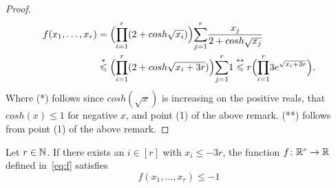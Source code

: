 \begin{proof} 
  \begin{equation*}
    \begin{align}
    f(x_1,\dots,x_r)&= \Bigl(\overunderset{r}{i=1}{\prod}(2+cosh\sqrt{x_i})\Bigr)\overunderset{r}{j=1}{\sum}\frac{x_j}{2+cosh \sqrt{x_j}}\\
    &\overset{*}{\leq} \Bigl(\overunderset{r}{i=1}{\prod}(2+cosh\sqrt{x_i +3r})\Bigr)\overunderset{r}{j=1}{\sum}1 \overset{**}{\leq}r\Bigl(\overunderset{r}{i=1}{\prod} 3e^{\sqrt{x_i+3r}}\Bigr),
    \end{align}
  \end{equation*}
  Where (*) follows since $cosh(\sqrt{x})$ is increasing on the positive reals, that $cosh(x)\leq 1$ for negative $x$, and point (1) of the above remark.
  (**) follows from point (1) of the above remark.
\end{proof}


\begin{lemma}
  \label{lem:special-function-ec}
  Let $r \in \mathbb{N}$. If there exists an $i \in [r]$ with $x_i \le - 3r$, the function $f \colon \mathbb{R}^r \rightarrow \mathbb{R}$ defined in~\eqref{eq:f} satisfies
  $$
  f(x_1,\dots,x_r) \le -1$$
\end{lemma}

